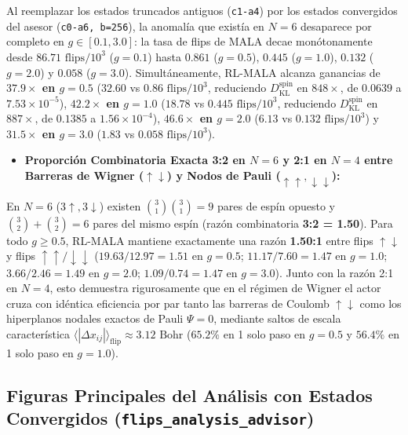 \documentclass[10pt,a4paper]{article}
\begin{document}
   Al reemplazar los estados truncados antiguos (\texttt{c1-a4}) por los estados convergidos del asesor (\texttt{c0-a6, b=256}), la anomalía que existía en $N=6$ desaparece por completo en $g \in [0.1, 3.0]$: la tasa de flips de MALA decae monótonamente desde $86.71\text{ flips}/10^3$ ($g=0.1$) hasta $0.861$ ($g=0.5$), $0.445$ ($g=1.0$), $0.132$ ($g=2.0$) y $0.058$ ($g=3.0$). Simultáneamente, RL-MALA alcanza ganancias de \textbf{$37.9\times$ en $g=0.5$} ($32.60$ vs $0.86\text{ flips}/10^3$, reduciendo $D_{\mathrm{KL}}^{\mathrm{spin}}$ en \textbf{$848\times$}, de $0.0639$ a $7.53 \times 10^{-5}$), \textbf{$42.2\times$ en $g=1.0$} ($18.78$ vs $0.445\text{ flips}/10^3$, reduciendo $D_{\mathrm{KL}}^{\mathrm{spin}}$ en \textbf{$887\times$}, de $0.1385$ a $1.56 \times 10^{-4}$), \textbf{$46.6\times$ en $g=2.0$} ($6.13$ vs $0.132\text{ flips}/10^3$) y \textbf{$31.5\times$ en $g=3.0$} ($1.83$ vs $0.058\text{ flips}/10^3$).

\begin{itemize}
\item \textbf{Proporción Combinatoria Exacta 3:2 en $N=6$ y 2:1 en $N=4$ entre Barreras de Wigner ($\uparrow\downarrow$) y Nodos de Pauli ($\uparrow\uparrow, \downarrow\downarrow$):}
\end{itemize}

   En $N=6$ ($3\uparrow, 3\downarrow$) existen $\binom{3}{1}\binom{3}{1} = 9$ pares de espín opuesto y $\binom{3}{2} + \binom{3}{2} = 6$ pares del mismo espín (razón combinatoria \textbf{3:2 = 1.50}). Para todo $g \ge 0.5$, RL-MALA mantiene exactamente una razón \textbf{1.50:1} entre flips $\uparrow\downarrow$ y flips $\uparrow\uparrow/\downarrow\downarrow$ ($19.63 / 12.97 = 1.51$ en $g=0.5$; $11.17 / 7.60 = 1.47$ en $g=1.0$; $3.66 / 2.46 = 1.49$ en $g=2.0$; $1.09 / 0.74 = 1.47$ en $g=3.0$). Junto con la razón 2:1 en $N=4$, esto demuestra rigurosamente que en el régimen de Wigner el actor cruza con idéntica eficiencia por par tanto las barreras de Coulomb $\uparrow\downarrow$ como los hiperplanos nodales exactos de Pauli $\Psi = 0$, mediante saltos de escala característica $\langle|\Delta x_{ij}|\rangle_{\mathrm{flip}} \approx 3.12\text{ Bohr}$ ($65.2\%$ en 1 solo paso en $g=0.5$ y $56.4\%$ en 1 solo paso en $g=1.0$).




\subsection{Figuras Principales del Análisis con Estados Convergidos (\texttt{flips\_analysis\_advisor})}
\end{document}
